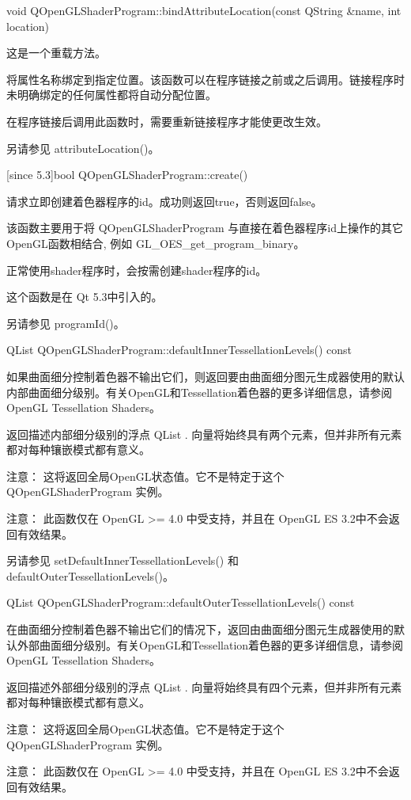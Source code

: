 void QOpenGLShaderProgram::bindAttributeLocation(const QString \&name, int location)

这是一个重载方法。

将属性名称绑定到指定位置。该函数可以在程序链接之前或之后调用。链接程序时未明确绑定的任何属性都将自动分配位置。

在程序链接后调用此函数时，需要重新链接程序才能使更改生效。

另请参见 attributeLocation()。

[since 5.3]bool QOpenGLShaderProgram::create()

请求立即创建着色器程序的id。成功则返回true，否则返回false。

该函数主要用于将 QOpenGLShaderProgram 与直接在着色器程序id上操作的其它OpenGL函数相结合, 例如 GL\_OES\_get\_program\_binary。

正常使用shader程序时，会按需创建shader程序的id。

这个函数是在 Qt 5.3中引入的。

另请参见 programId()。

QList QOpenGLShaderProgram::defaultInnerTessellationLevels() const

如果曲面细分控制着色器不输出它们，则返回要由曲面细分图元生成器使用的默认内部曲面细分级别。有关OpenGL和Tessellation着色器的更多详细信息，请参阅 OpenGL Tessellation Shaders。

返回描述内部细分级别的浮点 QList . 向量将始终具有两个元素，但并非所有元素都对每种镶嵌模式都有意义。

注意： 这将返回全局OpenGL状态值。它不是特定于这个QOpenGLShaderProgram 实例。

注意： 此函数仅在 OpenGL >= 4.0 中受支持，并且在 OpenGL ES 3.2中不会返回有效结果。

另请参见 setDefaultInnerTessellationLevels() 和 defaultOuterTessellationLevels()。

QList QOpenGLShaderProgram::defaultOuterTessellationLevels() const

在曲面细分控制着色器不输出它们的情况下，返回由曲面细分图元生成器使用的默认外部曲面细分级别。有关OpenGL和Tessellation着色器的更多详细信息，请参阅 OpenGL Tessellation Shaders。

返回描述外部细分级别的浮点 QList . 向量将始终具有四个元素，但并非所有元素都对每种镶嵌模式都有意义。

注意： 这将返回全局OpenGL状态值。它不是特定于这个QOpenGLShaderProgram 实例。

注意： 此函数仅在 OpenGL >= 4.0 中受支持，并且在 OpenGL ES 3.2中不会返回有效结果。

